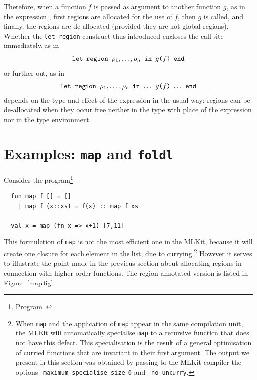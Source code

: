 \documentclass[12pt]{book}
\begin{document}
Therefore, when a function $f$ is passed as argument to another
function $g$, as in the expression , first regions are
allocated for the use of $f$, then $g$ is called, and finally, the
regions are de-allocated (provided they are not global regions).
Whether the {\tt let region} construct thus introduced encloses the
call site immediately, as in
$$\hbox{\tt let region $\rho_1,\ldots,\rho_n$ in $g$($f$) end}$$
or further out, as in
$$\hbox{\tt let region $\rho_1,\ldots,\rho_n$ in $\ldots$ $g$($f$)
  $\ldots$ end}$$
depends on the type and effect of the expression
 in the usual way: regions can be de-allocated when
they occur free neither in the type with place of the expression
nor in the type environment.

\section{Examples: \texttt{map} and \texttt{foldl}}
Consider the program\footnote{Program .}
\begin{verbatim}
  fun map f [] = []
    | map f (x::xs) = f(x) :: map f xs

  val x = map (fn x => x+1) [7,11]
\end{verbatim}
This formulation of {\tt map} is not the most efficient one in the
MLKit, because it will create one closure for each element in the
list, due to currying.\footnote{When {\tt map} and the application of
  {\tt map} appear in the same compilation unit, the MLKit will
  automatically specialise {\tt map} to a recursive function that does
  not have this defect. This specialisation is the result of a general
  optimisation of curried functions that are invariant in their first
  argument. The output we present in this section was obtained by
  passing to the MLKit compiler the options
  \texttt{-maximum\_specialise\_size 0} and \texttt{-no\_uncurry}.} However it serves to
illustrate the point made in the previous section about allocating
regions in connection with higher-order functions. The
region-annotated version is listed in Figure~\ref{map.fig}.
\end{document}
